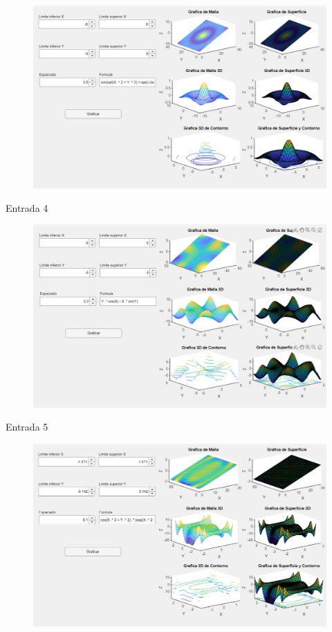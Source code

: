 \documentclass{article}
\begin{document}
	\begin{figure}[h]
		\centering
		\includegraphics[width=17cm]{img4.png}
	\end{figure}
	
	Entrada 4
	
	\begin{figure}[!]
		\centering
		\includegraphics[width=17cm]{img5.png}
	\end{figure}
	
	\newpage
	
	Entrada 5
	
	\begin{figure}[h]
		\centering
		\includegraphics[width=17cm]{img6.png}
	\end{figure}
	
\end{document}
